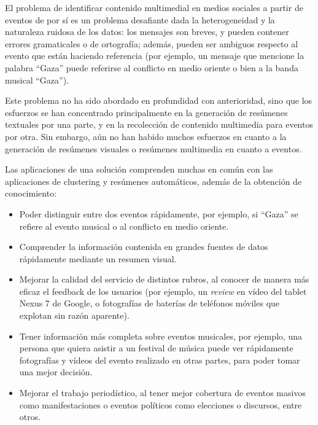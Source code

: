   El problema de identificar contenido multimedial en medios sociales
  a partir de eventos de por sí es un problema desafiante dada la
  heterogeneidad y la naturaleza ruidosa de los datos: los mensajes
  son breves, y pueden contener errores gramaticales o de ortografía;
  además, pueden ser ambiguos respecto al evento que están haciendo
  referencia (por ejemplo, un mensaje que mencione la palabra ``Gaza''
  puede referirse al conflicto en medio oriente o bien a la banda
  musical ``Gaza'').

  Este problema no ha sido abordado en profundidad con anterioridad,
  sino que los esfuerzos se han concentrado principalmente en la
  generación de resúmenes textuales por una parte\cite{Conrad:2005:EDC:1165485.1165513,allan2002topic,DBLP:conf:spire:Bravo-MarquezM12,Diakopoulos:2012:FAS:2208276.2208409},
  y en la recolección de contenido multimedia para eventos por
  otra\cite{Becker:2012:ICP:2124295.2124360,Liu:2011:USM:2072609.2072613,Becker:2010:LSM:1718487.1718524}. Sin embargo, aún no
  han habido muchos esfuerzos en cuanto a la generación de resúmenes
  visuales o resúmenes multimedia en cuanto a eventos.

  Las aplicaciones de una solución comprenden muchas en común con las
  aplicaciones de clustering y resúmenes automáticos, además de la
  obtención de conocimiento:

\begin{itemize}
\item Poder distinguir entre dos eventos rápidamente, por ejemplo, si
    ``Gaza'' se refiere al evento musical o al conflicto en medio
    oriente.
\item Comprender la información contenida en grandes fuentes de datos
    rápidamente mediante un resumen visual.
\item Mejorar la calidad del servicio de distintos rubros, al conocer de
    manera más eficaz el feedback de los usuarios (por ejemplo, un
    \emph{review} en vídeo del tablet Nexus 7 de Google, o fotografías de
    baterías de teléfonos móviles que explotan sin razón aparente).
\item Tener información más completa sobre eventos musicales, por
    ejemplo, una persona que quiera asistir a un festival de música
    puede ver rápidamente fotografías y vídeos del evento realizado en
    otras partes, para poder tomar una mejor decisión.
\item Mejorar el trabajo periodístico, al tener mejor cobertura de
    eventos masivos como manifestaciones o eventos políticos como
    elecciones o discursos, entre otros.
\end{itemize}
